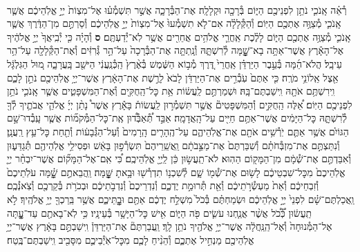 \documentclass[twoside, openany, parskip=half, 11pt]{book}
\begin{document}
\begin{footnotesize}
\begin{multicols}{2}
\\
רְ֯אֵ֗ה אָֽנֹכִ֛י נֹתֵ֥ן לִפְנֵיכֶ֖ם הַיּ֑וֹם בְּ֯רָכָ֖ה וּקְלָלָֽה׃ אֶת־הַבְּ֯רָכָ֑ה אֲשֶׁ֣ר תִּשְׁמְ֯ע֗וּ אֶל־מִצְוֹת֙ יְיָ֣ אֱלֹֽהֵיכֶ֔ם אֲשֶׁ֧ר אָֽנֹכִ֛י מְ֯צַוֶּ֥ה אֶתְכֶ֖ם הַיּֽוֹם׃ וְ֯הַקְּ֯לָלָ֗ה אִם־לֹ֤א תִשְׁמְ֯עוּ֙ אֶל־מִצְוֹת֙ יְיָ֣ אֱלֹֽהֵיכֶ֔ם וְ֯סַרְתֶּ֣ם מִן־הַדֶּ֔רֶךְ אֲשֶׁ֧ר אָֽנֹכִ֛י מְ֯צַוֶּ֥ה אֶתְכֶ֖ם הַיּ֑וֹם לָלֶ֗כֶת אַֽחֲרֵ֛י אֱלֹהִ֥ים אֲחֵרִ֖ים אֲשֶׁ֥ר לֹֽא־יְ֯דַעְתֶּֽם׃ \textbf{ס} וְ֯הָיָ֗ה כִּ֤י יְ֯בִֽיאֲךָ֙ יְיָ֣ אֱלֹהֶ֔יךָ אֶל־הָאָ֕רֶץ אֲשֶׁר־אַתָּ֥ה בָא־שׇׇׇׇׇׇׁ֖מָּה לְ֯רִשְׁתָּ֑הּ וְ֯נָֽתַתָּ֤ה אֶת־הַבְּ֯רָכָה֙ עַל־הַ֣ר גְּ֯רִזִּ֔ים וְ֯אֶת־הַקְּ֯לָלָ֖ה עַל־הַ֥ר עֵיבָֽל׃ הֲלֹא־הֵ֜מָּה בְּ֯עֵ֣בֶר הַיַּרְדֵּ֗ן אַֽחֲרֵי֙ דֶּ֚רֶךְ מְ֯ב֣וֹא הַשֶּׁ֔מֶשׁ בְּ֯אֶ֨רֶץ֙ הַֽכְּ֯נַֽעֲנִ֔י הַיּשֵׁ֖ב בָּֽעֲרָבָ֑ה מ֚וּל הַגִּלְגָּ֔ל אֵ֖צֶל אֵֽלוֹנֵ֥י מֹרֶֽה׃ כִּ֤י אַתֶּם֙ עֹֽבְ֯רִ֣ים אֶת־הַיַּרְדֵּ֔ן לָבֹא֙ לָרֶ֣שֶׁת אֶת־הָאָ֔רֶץ אֲשֶׁר־יְיָ֥ אֱלֹֽהֵיכֶ֖ם נֹתֵ֣ן לָכֶ֑ם וִֽירִשְׁתֶּ֥ם אֹתָ֖הּ וִֽישַׁבְתֶּם־בָּֽהּ׃
וּשְׁמַרְתֶּ֣ם לַֽעֲשׂ֔וֹת אֵ֥ת כׇּל־הַֽחֻקִּ֖ים וְ֯אֶת־הַמִּשְׁפָּטִ֑ים אֲשֶׁ֧ר אָֽנֹכִ֛י נֹתֵ֥ן לִפְנֵיכֶ֖ם הַיּֽוֹם׃
אֵ֠לֶּה הַֽחֻקִּ֣ים וְ֯הַמִּשְׁפָּטִים֘ אֲשֶׁ֣ר תִּשְׁמְ֯ר֣וּן לַֽעֲשׂוֹת֒ בָּאָ֕רֶץ אֲשֶׁר֩ נָתַ֨ן יְיָ֜ אֱלֹהֵ֧י אֲבֹתֶ֛יךָ לְ֯ךָ֖ לְ֯רִשְׁתָּ֑הּ כׇּל־הַיָּמִ֔ים אֲשֶׁר־אַתֶּ֥ם חַיִּ֖ים עַל־הָֽאֲדָמָֽה׃ אַבֵּ֣ד תְּ֠֯אַבְּ֯ד֠וּן אֶֽת־כׇּל־הַמְּ֯קֹמ֞וֹת אֲשֶׁ֧ר עָֽבְ֯דוּ־שָׁ֣ם הַגּוֹיִ֗ם אֲשֶׁ֥ר אַתֶּ֛ם יֹֽרְ֯שִׁ֥ים אֹתָ֖ם אֶת־אֱלֹֽהֵיהֶ֑ם עַל־הֶֽהָרִ֤ים הָֽרָמִים֙ וְ֯עַל־הַגְּ֯בָע֔וֹת וְ֯תַ֖חַת כׇּל־עֵ֥ץ רַֽעֲנָֽן׃ וְ֯נִתַּצְתֶּ֣ם אֶת־מִזְבְּ֯חֹתָ֗ם וְ֯שִׁבַּרְתֶּם֙ אֶת־מַצֵּ֣בֹתָ֔ם וַֽאֲשֵֽׁרֵיהֶם֙ תִּשְׂרְ֯פ֣וּן בָּאֵ֔שׁ וּפְסִילֵ֥י אֱלֹֽהֵיהֶ֖ם תְּ֯גַדֵּע֑וּן וְ֯אִבַּדְתֶּ֣ם אֶת־שְׁ֯מָ֔ם מִן־הַמָּק֖וֹם הַהֽוּא׃ לֹא־תַֽעֲשׂ֣וּן כֵּ֔ן לַֽיְיָ֖ אֱלֹֽהֵיכֶֽם׃ כִּ֠י אִֽם־אֶל־הַמָּק֞וֹם אֲשֶׁר־יִבְחַ֨ר יְיָ֤ אֱלֹֽהֵיכֶם֙ מִכׇּל־שִׁבְטֵיכֶ֔ם לָשׂ֥וּם אֶת־שְׁ֯מ֖וֹ שָׁ֑ם לְ֯שִׁכְנ֥וֹ תִדְרְ֯שׁ֖וּ וּבָ֥אתָ שׇׇׇׇׇׇׇׇּֽׁמָּה׃  וַֽהֲבֵאתֶ֣ם שׇׇׇׇׇׇׁ֗מָּה עֹלֹֽתֵיכֶם֙ וְ֯זִבְחֵיכֶ֔ם וְ֯אֵת֙ מַעְשְׂ֯רֹ֣תֵיכֶ֔ם וְ֯אֵ֖ת תְּ֯רוּמַ֣ת יֶדְכֶ֑ם וְ֯נִדְרֵיכֶם֙ וְ֯נִדְבֹ֣תֵיכֶ֔ם וּבְכֹרֹ֥ת בְּ֯קַרְכֶ֖ם וְ֯צֹֽאנְ֯כֶֽם׃ וַֽאֲכַלְתֶּם־שָׁ֗ם לִפְנֵי֙ יְיָ֣ אֱלֹֽהֵיכֶ֔ם וּשְׂמַחְתֶּ֗ם בְּ֯כֹל֙ מִשְׁלַ֣ח יֶדְכֶ֔ם אַתֶּ֖ם וּבׇׇׇׇׇׇׇׇׇׇׇׇׇׇֽתֵּיכֶ֑ם אֲשֶׁ֥ר בֵּֽרַכְךָ֖ יְיָ֥ אֱלֹהֶֽיךָ׃ לֹ֣א תַֽעֲשׂ֔וּן כְּ֠֯כֹ֠ל אֲשֶׁ֨ר אֲנַ֧חְנוּ עֹשִׂ֛ים פֹּ֖ה הַיּ֑וֹם אִ֖ישׁ כׇּל־הַיָּשָׁ֥ר בְּ֯עֵינָֽיו׃ כִּ֥י לֹֽא־בָאתֶ֖ם עַד־עׇׇׇׇׇׇ֑תָּה אֶל־הַמְּ֯נוּחָה֙ וְ֯אֶל־הַֽנַּֽחֲלָ֔ה אֲשֶׁר־יְיָ֥ אֱלֹהֶ֖יךָ נֹתֵ֥ן לָֽךְ׃ וַֽעֲבַרְתֶּם֘ אֶת־הַיַּרְדֵּן֒ וִֽישַׁבְתֶּ֣ם בָּאָ֔רֶץ אֲשֶׁר־יְיָ֥ אֱלֹֽהֵיכֶ֖ם מַנְחִ֣יל אֶתְכֶ֑ם וְ֯הֵנִ֨יחַ לָכֶ֧ם מִכׇּל־אֹֽיְ֯בֵיכֶ֛ם מִסָּבִ֖יב וִֽישַׁבְתֶּם־בֶּֽטַח׃


\end{multicols}
\end{footnotesize}
\end{document}
